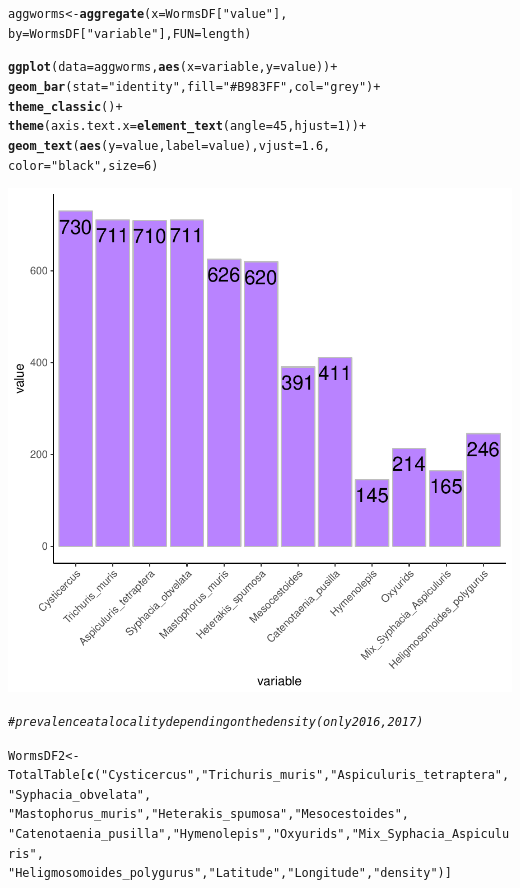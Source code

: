 \documentclass{article}\usepackage[]{graphicx}\usepackage[]{color}
\makeatletter
\newcommand{\hlnum}[1]{\textcolor[rgb]{0.686,0.059,0.569}{#1}}%
\newcommand{\hlstr}[1]{\textcolor[rgb]{0.192,0.494,0.8}{#1}}%
\newcommand{\hlcom}[1]{\textcolor[rgb]{0.678,0.584,0.686}{\textit{#1}}}%
\newcommand{\hlopt}[1]{\textcolor[rgb]{0,0,0}{#1}}%
\newcommand{\hlstd}[1]{\textcolor[rgb]{0.345,0.345,0.345}{#1}}%
\newcommand{\hlkwb}[1]{\textcolor[rgb]{0.69,0.353,0.396}{#1}}%
\newcommand{\hlkwc}[1]{\textcolor[rgb]{0.333,0.667,0.333}{#1}}%
\newcommand{\hlkwd}[1]{\textcolor[rgb]{0.737,0.353,0.396}{\textbf{#1}}}%
\newenvironment{kframe}{%
 \def\at@end@of@kframe{}%
 \ifinner\ifhmode%
  \def\at@end@of@kframe{\end{minipage}}%
  \begin{minipage}{\columnwidth}%
 \fi\fi%
 \def\FrameCommand##1{\hskip\@totalleftmargin \hskip-\fboxsep
 \colorbox{shadecolor}{##1}\hskip-\fboxsep
     \hskip-\linewidth \hskip-\@totalleftmargin \hskip\columnwidth}%
 \MakeFramed {\advance\hsize-\width
   \@totalleftmargin\z@ \linewidth\hsize
   \@setminipage}}%
 {\par\unskip\endMakeFramed%
 \at@end@of@kframe}
\newenvironment{knitrout}{}{} %
\makeatother
\begin{document}
\begin{knitrout}
\begin{kframe}
\begin{alltt}
\hlstd{aggworms} \hlkwb{<-} \hlkwd{aggregate}\hlstd{(}\hlkwc{x} \hlstd{= WormsDF[}\hlstr{"value"}\hlstd{],}
                      \hlkwc{by} \hlstd{= WormsDF[}\hlstr{"variable"}\hlstd{],} \hlkwc{FUN} \hlstd{= length)}

\hlkwd{ggplot}\hlstd{(}\hlkwc{data}\hlstd{=aggworms,} \hlkwd{aes}\hlstd{(}\hlkwc{x}\hlstd{=variable,} \hlkwc{y}\hlstd{=value))} \hlopt{+}
  \hlkwd{geom_bar}\hlstd{(}\hlkwc{stat}\hlstd{=}\hlstr{"identity"}\hlstd{,} \hlkwc{fill} \hlstd{=} \hlstr{"#B983FF"}\hlstd{,} \hlkwc{col} \hlstd{=} \hlstr{"grey"}\hlstd{)} \hlopt{+}
  \hlkwd{theme_classic}\hlstd{()} \hlopt{+}
  \hlkwd{theme}\hlstd{(}\hlkwc{axis.text.x} \hlstd{=} \hlkwd{element_text}\hlstd{(}\hlkwc{angle} \hlstd{=} \hlnum{45}\hlstd{,} \hlkwc{hjust} \hlstd{=} \hlnum{1}\hlstd{))}\hlopt{+}
  \hlkwd{geom_text}\hlstd{(}\hlkwd{aes}\hlstd{(}\hlkwc{y}\hlstd{=value,} \hlkwc{label}\hlstd{=value),} \hlkwc{vjust}\hlstd{=}\hlnum{1.6}\hlstd{,}
            \hlkwc{color}\hlstd{=}\hlstr{"black"}\hlstd{,} \hlkwc{size}\hlstd{=}\hlnum{6}\hlstd{)}
\end{alltt}
\end{kframe}

{\centering \includegraphics[width=.6\linewidth]{figure/Data-Analysis-Alice-2017-Rnwauto-report-13} 

}


\begin{kframe}\begin{alltt}
\hlcom{# prevalence at a locality depending on the density (only 2016, 2017)}

\hlstd{WormsDF2} \hlkwb{<-} \hlstd{TotalTable[}\hlkwd{c}\hlstd{(}\hlstr{"Cysticercus"}\hlstd{,} \hlstr{"Trichuris_muris"}\hlstd{,} \hlstr{"Aspiculuris_tetraptera"}\hlstd{,} \hlstr{"Syphacia_obvelata"}\hlstd{,}
                        \hlstr{"Mastophorus_muris"}\hlstd{,} \hlstr{"Heterakis_spumosa"}\hlstd{,} \hlstr{"Mesocestoides"}\hlstd{,}
                        \hlstr{"Catenotaenia_pusilla"}\hlstd{,} \hlstr{"Hymenolepis"}\hlstd{,} \hlstr{"Oxyurids"}\hlstd{,} \hlstr{"Mix_Syphacia_Aspiculuris"}\hlstd{,}
                        \hlstr{"Heligmosomoides_polygurus"}\hlstd{,} \hlstr{"Latitude"}\hlstd{,} \hlstr{"Longitude"}\hlstd{,} \hlstr{"density"}\hlstd{)]}


\end{alltt}
\end{kframe}
\end{knitrout}
\end{document}
